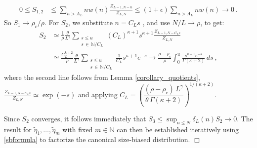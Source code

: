 \documentclass[pdflatex,sn-mathphys-num]{sn-jnl}%
\theoremstyle{thmstyleone}%
\theoremstyle{thmstyletwo}%
\theoremstyle{thmstylethree}%
\begin{document}
\begin{equation*}
	\begin{aligned}
		0 \le S_{1, 2} &\le \sum_{n> A_L} n w(n) \frac{Z_{L-1,N-n}}{Z_{L,N}} \le (1+\epsilon )\sum_{n> A_L} n w(n)\to 0\ .
	\end{aligned}
\end{equation*}
So $S_1 \to\rho_c /\rho$. 
For $S_2$, we substitute $n = C_L s$ , and use $N/L\to \rho$, to get:
\begin{align*}
		S_2 
		&\simeq \frac{1}{\rho} \frac{\theta}{L^\gamma} \sum_{\substack{s \leq u \\ s \, \in \, \mathbb{N}/C_L}} (C_L)^{\kappa +1} s^{\kappa +1} \frac{Z_{L-1,N-C_L s}}{Z_{L,N}} \\
		&%
		\simeq\frac{C_L^{k+2}}{\rho} \frac{\theta}{L^\gamma}  \sum_{\substack{s \leq u \\ s \, \in \, \mathbb{N}/C_L}} \frac{1}{C_L} s^{\kappa +1} e^{-s} \to \frac{\rho-\rho_c}{\rho} \int_0^u \frac{s^{\kappa +1}e^{-s}}{\Gamma(\kappa +2)} \, ds\ ,
\end{align*}
where the second line follows from Lemma \ref{corollary_quotients}, $\frac{Z_{L-1,N-C_L s}}{Z_{L,N}} \simeq \exp\left(-s\right)$ and applying  $C_L = \left(\dfrac{(\rho - \rho_c) \, L^\gamma}{ \theta \, \Gamma(\kappa +2)}\right)^{1/(\kappa +2)}$.

Since $S_2$ converges, it follows immediately that $S_3 \leq\sup_{n\leq N} \delta_L (n) S_2\to 0$. 
The result for $\tilde{\eta}_1, \dots , \tilde{\eta}_m$ with fixed $m \in \mathbb{N}$ can then be established iteratively using \eqref{sbformula} to factorize the canonical size-biased distribution.
\hfill $\Box$
\end{document}
